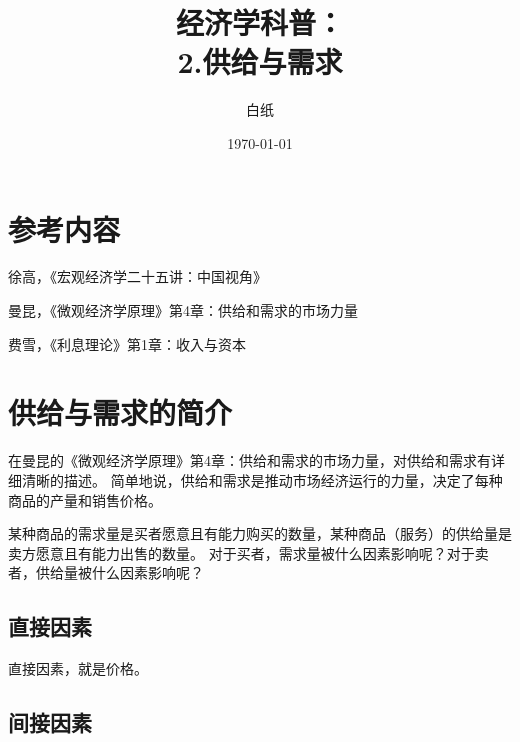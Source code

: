 \documentclass[UTF8]{article}
\title{经济学科普： \\ 2.供给与需求}
\author{白纸}
\date{\today}
\begin{document}
\maketitle

\section{参考内容}
    徐高，《宏观经济学二十五讲：中国视角》\par
    曼昆，《微观经济学原理》第4章：供给和需求的市场力量\par
    费雪，《利息理论》第1章：收入与资本

\section{供给与需求的简介}
    在曼昆的《微观经济学原理》第4章：供给和需求的市场力量，对供给和需求有详细清晰的描述。
    简单地说，供给和需求是推动市场经济运行的力量，决定了每种商品的产量和销售价格。\par
    某种商品的需求量是买者愿意且有能力购买的数量，某种商品（服务）的供给量是卖方愿意且有能力出售的数量。
    对于买者，需求量被什么因素影响呢？对于卖者，供给量被什么因素影响呢？
    
    \subsection{直接因素}
        直接因素，就是价格。

    \subsection{间接因素}
\end{document}
